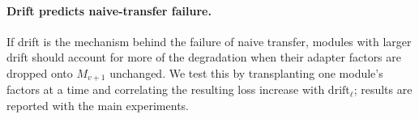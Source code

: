 \paragraph{Drift predicts naive-transfer failure.}
If drift is the mechanism behind the failure of naive transfer, modules with
larger drift should account for more of the degradation when their adapter
factors are dropped onto $M_{v+1}$ unchanged. We test this by transplanting one
module's factors at a time and correlating the resulting loss increase with
$\mathrm{drift}_\ell$; results are reported with the main experiments.
